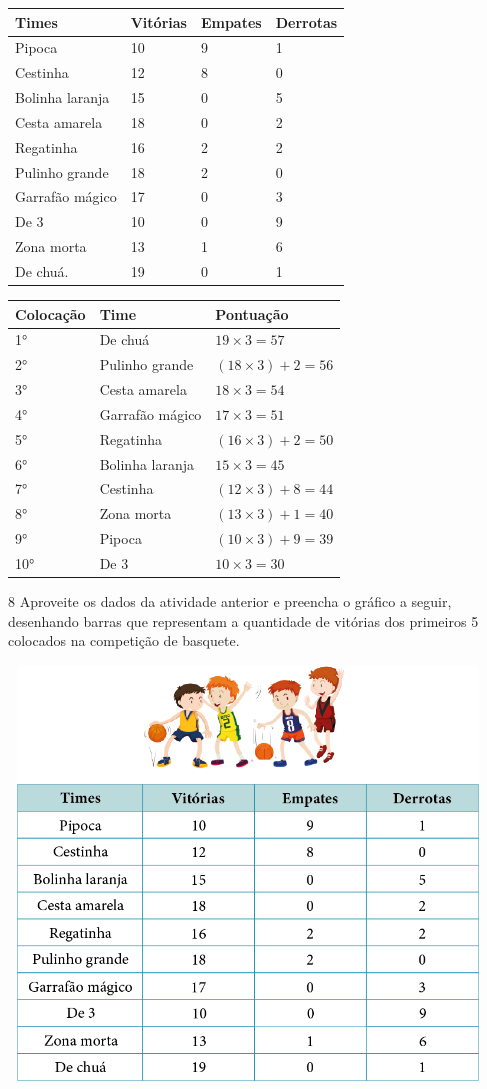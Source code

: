 \begin{escolha}
\begin{escolha}
\begin{longtable}[]{@{}llll@{}}
\toprule
Times & Vitórias & Empates & Derrotas\tabularnewline
\midrule
\endhead
Pipoca & 10 & 9 & 1\tabularnewline
Cestinha & 12 & 8 & 0\tabularnewline
Bolinha laranja & 15 & 0 & 5\tabularnewline
Cesta amarela & 18 & 0 & 2\tabularnewline
Regatinha & 16 & 2 & 2\tabularnewline
Pulinho grande & 18 & 2 & 0\tabularnewline
Garrafão mágico & 17 & 0 & 3\tabularnewline
De 3 & 10 & 0 & 9\tabularnewline
Zona morta & 13 & 1 & 6\tabularnewline
De chuá. & 19 & 0 & 1\tabularnewline
\bottomrule
\end{longtable}

\begin{longtable}[]{@{}lll@{}}
\toprule
Colocação & Time & Pontuação\tabularnewline
\midrule
\endhead
1° & De chuá & \(19 \times 3 = 57\ \)\tabularnewline
2° & Pulinho grande &
\(\left( 18 \times 3 \right) + 2 = 56\)\tabularnewline
3° & Cesta amarela & \(18 \times 3 = 54\ \)\tabularnewline
4° & Garrafão mágico & \(17 \times 3 = 51\ \)\tabularnewline
5° & Regatinha & \(\left( 16 \times 3 \right) + 2 = 50\)\tabularnewline
6° & Bolinha laranja & \(15 \times 3 = 45\ \)\tabularnewline
7° & Cestinha & \(\left( 12 \times 3 \right) + 8 = 44\)\tabularnewline
8° & Zona morta & \(\left( 13 \times 3 \right) + 1 = 40\)\tabularnewline
9° & Pipoca & \(\left( 10 \times 3 \right) + 9 = 39\)\tabularnewline
10° & De 3 & \(10 \times 3 = 30\ \)\tabularnewline
\bottomrule
\end{longtable}

\num{8} Aproveite os dados da atividade anterior e preencha o gráfico a seguir,
desenhando barras que representam a quantidade de vitórias dos primeiros
5 colocados na competição de basquete.


\includegraphics[width=5.00000in,height=4.33333in]{media/image94.png}


\end{escolha}
\end{escolha}
